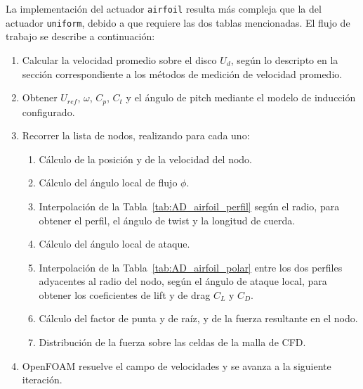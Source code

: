 La implementación del actuador \texttt{airfoil} resulta más compleja que la del actuador \texttt{uniform}, debido a que requiere las dos tablas mencionadas. El flujo de trabajo se describe a continuación:
\begin{enumerate}
\item Calcular la velocidad promedio sobre el disco $U_d$, según lo descripto en la sección correspondiente a los métodos de medición de velocidad promedio.
\item Obtener $U_{ref}$, $\omega$, $C_p$, $C_t$ y el ángulo de pitch mediante el modelo de inducción configurado.
\item Recorrer la lista de nodos, realizando para cada uno:
\begin{enumerate}
\item Cálculo de la posición y de la velocidad del nodo.
\item Cálculo del ángulo local de flujo $\phi$.
\item Interpolación de la Tabla~\ref{tab:AD_airfoil_perfil} según el radio, para obtener el perfil, el ángulo de twist y la longitud de cuerda.
\item Cálculo del ángulo local de ataque.
\item Interpolación de la Tabla~\ref{tab:AD_airfoil_polar} entre los dos perfiles adyacentes al radio del nodo, según el ángulo de ataque local, para obtener los coeficientes de lift y de drag $C_L$ y $C_D$.
\item Cálculo del factor de punta y de raíz, y de la fuerza resultante en el nodo.
\item Distribución de la fuerza sobre las celdas de la malla de CFD.
\end{enumerate}
\item OpenFOAM resuelve el campo de velocidades y se avanza a la siguiente iteración.
\end{enumerate}

